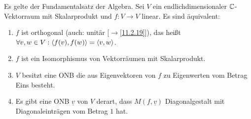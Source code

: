 \documentclass[../../main.tex]{subfiles}
\begin{document}
\begin{kor}\label{15.2.6}
Es gelte der Fundamentalsatz der Algebra. Sei $V$ ein endlichdimensionaler $\mathbb C$-Vektorraum mit Skalarprodukt und $f: V\to V$ linear. Es sind äquivalent:
\begin{enumerate}[\normalfont(a)]
\item $f$ ist orthogonal (auch: unitär [$\to$\ref{11.2.19}]), das heißt $\forall v,w\in V: \langle f(v),f(w)\rangle=\langle v,w\rangle$.
\item $f$ ist ein Isomorphismus von Vektorräumen mit Skalarprodukt.
\item $V$ besitzt eine ONB die aus Eigenvektoren von $f$ zu Eigenwerten vom Betrag Eins besteht.
\item Es gibt eine ONB $\underline{v}$ von $V$ derart, dass $M(f,\underline{v})$ Diagonalgestalt mit Diagonaleinträgen vom Betrag $1$ hat.
\end{enumerate}	
\end{kor}
\end{document}
